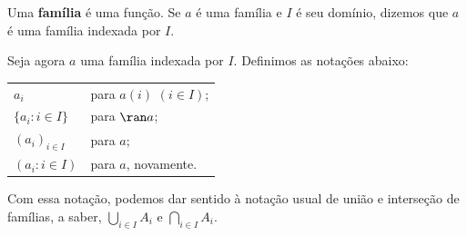 \begin{definition}[$\BST$]\label{def:familia}
    Uma \textbf{família} é uma função.
    Se $a$ é uma família e $I$ é seu domínio, dizemos que $a$ é uma família indexada por $I$.
    
    Seja agora $a$ uma família indexada por $I$.
    Definimos as notações abaixo:
    \begin{center}
    \begin{tabular}{@{}l@{\qquad}l@{}}
    $a_i$ & para $a(i)$ $(i \in I)$; \\
    $\{a_i : i \in I\}$ & para $\ran a$; \\
    $(a_i)_{i\in I}$ & para $a$; \\
    $(a_i : i \in I)$ & para $a$, novamente.
    \end{tabular}
    \end{center}
\end{definition}


Com essa notação, podemos dar sentido à notação usual de união e interseção de famílias, a saber, $\bigcup_{i\in I} A_i$ e $\bigcap_{i\in I} A_i$.

